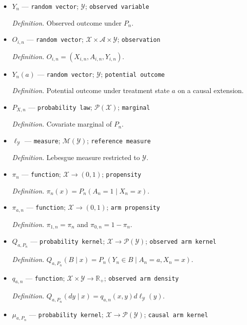 \documentclass{article}
\begin{document}
\begin{itemize}
  \item \(Y_n\) --- \texttt{random vector}; \(\mathcal Y\); \texttt{observed variable}
  \par\smallskip\noindent\emph{Definition.} Observed outcome under \(P_n\).
  \item \(O_{i,n}\) --- \texttt{random vector}; \(\mathcal X\times\mathcal A\times\mathcal Y\); \texttt{observation}
  \par\smallskip\noindent\emph{Definition.} \(O_{i,n}=(X_{i,n},A_{i,n},Y_{i,n})\).
  \item \(Y_n(a)\) --- \texttt{random vector}; \(\mathcal Y\); \texttt{potential outcome}
  \par\smallskip\noindent\emph{Definition.} Potential outcome under treatment state \(a\) on a causal extension.
  \item \(P_{X,n}\) --- \texttt{probability law}; \(\mathcal P(\mathcal X)\); \texttt{marginal}
  \par\smallskip\noindent\emph{Definition.} Covariate marginal of \(P_n\).
  \item \(\ell_{\mathcal Y}\) --- \texttt{measure}; \(\mathcal M(\mathcal Y)\); \texttt{reference measure}
  \par\smallskip\noindent\emph{Definition.} Lebesgue measure restricted to \(\mathcal Y\).
  \item \(\pi_n\) --- \texttt{function}; \(\mathcal X\to(0,1)\); \texttt{propensity}
  \par\smallskip\noindent\emph{Definition.} \(\pi_n(x)=P_n(A_n=1\mid X_n=x)\).
  \item \(\pi_{a,n}\) --- \texttt{function}; \(\mathcal X\to(0,1)\); \texttt{arm propensity}
  \par\smallskip\noindent\emph{Definition.} \(\pi_{1,n}=\pi_n\) and \(\pi_{0,n}=1-\pi_n\).
  \item \(Q_{a,P_n}\) --- \texttt{probability kernel}; \(\mathcal X\to\mathcal P(\mathcal Y)\); \texttt{observed arm kernel}
  \par\smallskip\noindent\emph{Definition.} \(Q_{a,P_n}(B\mid x)=P_n(Y_n\in B\mid A_n=a,X_n=x)\).
  \item \(q_{a,n}\) --- \texttt{function}; \(\mathcal X\times\mathcal Y\to\mathbb R_+\); \texttt{observed arm density}
  \par\smallskip\noindent\emph{Definition.} \(Q_{a,P_n}(dy\mid x)=q_{a,n}(x,y)d\ell_{\mathcal Y}(y)\).
  \item \(\mu_{a,P_n}\) --- \texttt{probability kernel}; \(\mathcal X\to\mathcal P(\mathcal Y)\); \texttt{causal arm kernel}

\end{itemize}
\end{document}
